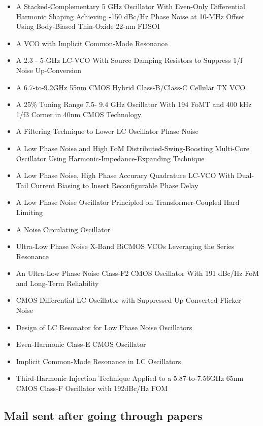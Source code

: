 \documentclass{article}
\begin{document}
\begin{itemize}
	\item A Stacked-Complementary 5 GHz Oscillator With Even-Only Differential Harmonic Shaping Achieving -150 dBc/Hz Phase Noise at 10-MHz Offset Using Body-Biased Thin-Oxide 22-nm FDSOI
	\item A VCO with Implicit Common-Mode Resonance
	\item A 2.3 - 5-GHz LC-VCO With Source Damping Resistors to Suppress 1/f Noise Up-Conversion
	\item A 6.7-to-9.2GHz 55nm CMOS Hybrid Class-B/Class-C Cellular TX VCO
	\item A 25\% Tuning Range 7.5- 9.4 GHz Oscillator With 194 FoMT and 400 kHz 1/f3 Corner in 40nm CMOS Technology
	\item A Filtering Technique to Lower LC Oscillator Phase Noise
	\item A Low Phase Noise and High FoM Distributed-Swing-Boosting Multi-Core Oscillator Using Harmonic-Impedance-Expanding Technique
	\item A Low Phase Noise, High Phase Accuracy Quadrature LC-VCO With Dual-Tail Current Biasing to Insert Reconfigurable Phase Delay
	\item A Low Phase Noise Oscillator Principled on Transformer-Coupled Hard Limiting
	\item A Noise Circulating Oscillator
	\item Ultra-Low Phase Noise X-Band BiCMOS VCOs Leveraging the Series Resonance
	\item An Ultra-Low Phase Noise Class-F2 CMOS Oscillator With 191 dBc/Hz FoM and Long-Term Reliability
	\item CMOS Differential LC Oscillator with Suppressed Up-Converted Flicker Noise
	\item Design of LC Resonator for Low Phase Noise Oscillators
	\item Even-Harmonic Class-E CMOS Oscillator
	\item Implicit Common-Mode Resonance in LC Oscillators
	\item Third-Harmonic Injection Technique Applied to a 5.87-to-7.56GHz 65nm CMOS Class-F Oscillator with 192dBc/Hz FOM
\end{itemize}

\subsection{Mail sent after going through papers}

\end{document}
